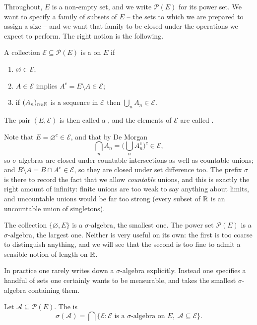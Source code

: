 \documentclass[a4paper]{scrartcl}
\newcommand{\cA}{\mathcal{A}}
\newcommand{\cE}{\mathcal{E}}
\begin{document}
Throughout, $E$ is a non-empty set, and we write $\mathcal{P}(E)$ for its power set. We want to specify a family of subsets of $E$ -- the sets to which we are prepared to assign a size -- and we want that family to be closed under the operations we expect to perform. The right notion is the following.

\begin{definition}
	A collection $\cE \subseteq \mathcal{P}(E)$ is a  on $E$ if
	\begin{enumerate}[label=(\roman*)]
		\item $\varnothing \in \cE$;
		\item $A \in \cE$ implies $A^c = E \setminus A \in \cE$;
		\item if $(A_n)_{n \in \mathbb{N}}$ is a sequence in $\cE$ then $\bigcup_{n} A_n \in \cE$.
	\end{enumerate}
	The pair $(E, \cE)$ is then called a , and the elements of $\cE$ are called .
\end{definition}

Note that $E = \varnothing^c \in \cE$, and that by De Morgan
$$
\bigcap_n A_n = \Big( \bigcup_n A_n^c \Big)^c \in \cE,
$$
so $\sigma$-algebras are closed under countable intersections as well as countable unions; and $B \setminus A = B \cap A^c \in \cE$, so they are closed under set difference too. The prefix $\sigma$ is there to record the fact that we allow \emph{countable} unions, and this is exactly the right amount of infinity: finite unions are too weak to say anything about limits, and uncountable unions would be far too strong (every subset of $\mathbb{R}$ is an uncountable union of singletons).

\begin{example}
	The collection $\{\varnothing, E\}$ is a $\sigma$-algebra, the smallest one. The power set $\mathcal{P}(E)$ is a $\sigma$-algebra, the largest one. Neither is very useful on its own: the first is too coarse to distinguish anything, and we will see that the second is too fine to admit a sensible notion of length on $\mathbb{R}$.
\end{example}

In practice one rarely writes down a $\sigma$-algebra explicitly. Instead one specifies a handful of sets one certainly wants to be measurable, and takes the smallest $\sigma$-algebra containing them.

\begin{definition}
	Let $\cA \subseteq \mathcal{P}(E)$. The \vocab{$\sigma$-algebra generated by $\cA$} is
	$$
	\sigma(\cA) = \bigcap \{ \cE : \cE \text{ is a $\sigma$-algebra on } E, \; \cA \subseteq \cE \}.
	$$
\end{definition}
\end{document}
